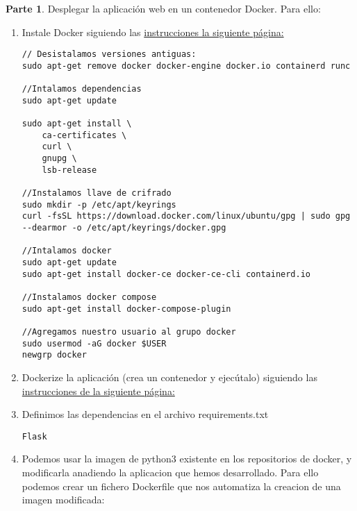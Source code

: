 \documentclass{article}
\begin{document}
 
\textbf{Parte 1}. Desplegar la aplicación web en un contenedor Docker. Para ello:
\begin{enumerate}
\item Instale Docker siguiendo las \href{https://1984.lsi.us.es/wiki-egc/index.php/Despliegue_de_aplicaciones:_Contenedores_22-23}{instrucciones la siguiente página:}


 



\lstset{language=C, breaklines=true, basicstyle=\footnotesize}
\begin{lstlisting}[frame=single]
// Desistalamos versiones antiguas:
sudo apt-get remove docker docker-engine docker.io containerd runc

//Intalamos dependencias
sudo apt-get update

sudo apt-get install \
	ca-certificates \
	curl \
	gnupg \
	lsb-release
	
//Instalamos llave de crifrado
sudo mkdir -p /etc/apt/keyrings
curl -fsSL https://download.docker.com/linux/ubuntu/gpg | sudo gpg --dearmor -o /etc/apt/keyrings/docker.gpg

//Intalamos docker
sudo apt-get update
sudo apt-get install docker-ce docker-ce-cli containerd.io 

//Instalamos docker compose
sudo apt-get install docker-compose-plugin

//Agregamos nuestro usuario al grupo docker
sudo usermod -aG docker $USER
newgrp docker
\end{lstlisting}

\item Dockerize la aplicación (crea un contenedor y ejecútalo) siguiendo las \href{https://1984.lsi.us.es/wiki-egc/index.php/Ejercicio_1:_Creando_mi_propia_imagen_para_una_app_python_22-23}{instrucciones de la siguiente
página:}
\item Definimos las dependencias en el archivo requirements.txt
\lstset{language=C, breaklines=true, basicstyle=\footnotesize}
\begin{lstlisting}[frame=single]
Flask
\end{lstlisting}
\item Podemos usar la imagen de python3 existente en los repositorios de docker, y modificarla anadiendo la aplicacion que hemos desarrollado. Para ello podemos crear un fichero Dockerfile que nos automatiza la creacion de una imagen modificada:


\end{enumerate}
\end{document}

